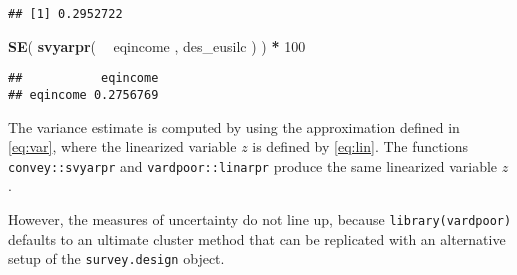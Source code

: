 \documentclass[]{book}
\newenvironment{Shaded}{\begin{snugshade}}{\end{snugshade}}
\newcommand{\DecValTok}[1]{\textcolor[rgb]{0.00,0.00,0.81}{#1}}
\newcommand{\KeywordTok}[1]{\textcolor[rgb]{0.13,0.29,0.53}{\textbf{#1}}}
\newcommand{\NormalTok}[1]{#1}
\newcommand{\OperatorTok}[1]{\textcolor[rgb]{0.81,0.36,0.00}{\textbf{#1}}}
\newcommand{\StringTok}[1]{\textcolor[rgb]{0.31,0.60,0.02}{#1}}
\begin{document}
\begin{verbatim}
## [1] 0.2952722
\end{verbatim}

\begin{Shaded}
\begin{Highlighting}[]
\KeywordTok{SE}\NormalTok{( }\KeywordTok{svyarpr}\NormalTok{( }\OperatorTok{~}\StringTok{ }\NormalTok{eqincome , des_eusilc ) ) }\OperatorTok{*}\StringTok{ }\DecValTok{100}
\end{Highlighting}
\end{Shaded}

\begin{verbatim}
##           eqincome
## eqincome 0.2756769
\end{verbatim}

The variance estimate is computed by using the approximation defined in \eqref{eq:var}, where the linearized variable \(z\) is defined by \eqref{eq:lin}. The functions \texttt{convey::svyarpr} and \texttt{vardpoor::linarpr} produce the same linearized variable \(z\).

However, the measures of uncertainty do not line up, because \texttt{library(vardpoor)} defaults to an ultimate cluster method that can be replicated with an alternative setup of the \texttt{survey.design} object.
\end{document}
